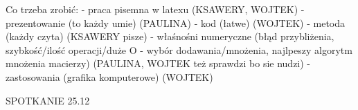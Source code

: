 \documentclass{article}
\begin{document}

Co trzeba zrobić:
- praca pisemna w latexu (KSAWERY, WOJTEK)
- prezentowanie (to każdy umie) (PAULINA)
- kod (łatwe) (WOJTEK)
- metoda (każdy czyta) (KSAWERY pisze)
- właśnośni numeryczne (błąd przybliżenia, szybkość/ilość operacji/duże O - wybór dodawania/mnożenia, najlpeszy algorytm mnożenia macierzy) (PAULINA, WOJTEK też sprawdzi bo sie nudzi)
- zastosowania (grafika komputerowe) (WOJTEK)

SPOTKANIE 25.12
\end{document}
